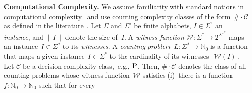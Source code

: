 \documentclass{article}
\newcommand{\Nat}{\mathbb{N}} %
\newcommand{\CCard}[1]{\|#1\|}
\newcommand{\Card}[1]{\left|#1\right|}
\renewcommand{\P}{\ensuremath{\textsc{P}}\xspace}
\newcommand{\WWW}{\ensuremath{\mathcal{W}}}%
\newcommand{\mtext}[1]{\ensuremath{\mathcal{#1}}}
\newcommand{\cnt}[0]{\ensuremath{\#}}
\newcommand{\cntc}[0]{\ensuremath{\cnt\cdot}}
\begin{document}
\smallskip\noindent\textbf{Computational Complexity.}
%
%
We assume familiarity with standard notions in
  computational complexity~\cite{Papadimitriou94} and use counting complexity classes of the form~$\cntc\mtext{C}$
  as defined in the literature~\cite{TodaWatanabe92,DurandHermannKolaitis05,HemaspaandraVollmer95a}.
%
%
%
%
%
%
%
%
Let $\Sigma$ and $\Sigma'$ be finite alphabets, $I \in \Sigma^*$ an \emph{instance}, and $\CCard{I}$
 denote the size of~$I$. %
%
%
%
%
A \emph{witness function} %
 $\mathcal{W}: \Sigma^* \rightarrow 2^{{\Sigma'}^*}$ %
maps an instance~$I \in \Sigma^*$ to its \emph{witnesses}. 
A
\emph{counting
  problem}~$L: \Sigma^* \rightarrow \Nat_0$ is a
function that maps a given instance~$I \in \Sigma^*$ to the cardinality of its
witnesses~$\Card{\WWW(I)}$.
%
%
Let $\mtext{C}$ be a decision complexity class,~e.g., \P. Then,
$\cntc\mtext{C}$ denotes the class of all counting problems whose
witness function~$\WWW$ satisfies (i)~there is a
function~$f: \Nat_0 \rightarrow \Nat_0$ such that for every
\end{document}

